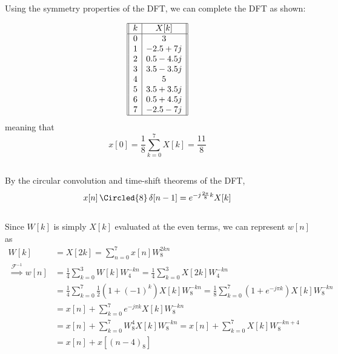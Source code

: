 \documentclass{article}
\begin{document}
\subsection{}

Using the symmetry properties of the DFT, we can complete the DFT as shown:

\begin{equation}
    \begin{array}[]{||c|c||}
        \hline
        k & X[k] \\
        \hline
        0 & 3 \\
        1 & -2.5 + 7j \\
        2 & 0.5 - 4.5j \\
        3 & 3.5 - 3.5j \\
        4 & 5 \\
        5 & 3.5 + 3.5j \\
        6 & 0.5 + 4.5j \\
        7 & -2.5 - 7j \\
        \hline
    \end{array}
\end{equation}
meaning that
\begin{equation}
    x[0] = \frac{1}{8} \sum_{k = 0}^7 X[k] = \frac{11}{8}
\end{equation}

\subsection{}

By the circular convolution and time-shift theorems of the DFT,
\begin{equation}
    x[n] \, \Circled{8} \, \delta[n - 1] = e^{-j \frac{2\pi}{8} k} X[k]
\end{equation}

\subsection{}

Since \(W[k]\) is simply \(X[k]\) evaluated at the even terms, we can represent \(w[n]\) as
\begin{align}
    W[k] &= X[2k] = \sum_{n = 0}^7 x[n] W_8^{2kn} \\
    \overset{\mathcal{F}^{-1}}{\implies} w[n] &= \frac{1}{4} \sum_{k = 0}^3 W[k] W_4^{-kn} = \frac{1}{4} \sum_{k = 0}^3 X[2k] W_4^{-kn} \\
    &= \frac{1}{4} \sum_{k = 0}^7 \frac{1}{2} (1 + (-1)^k) X[k] W_8^{-kn} = \frac{1}{8} \sum_{k = 0}^7 (1 + e^{-j \pi k}) X[k] W_8^{-kn} \\
    &= x[n] + \sum_{k = 0}^7 e^{-j \pi k} X[k] W_8^{-kn} \\
    &= x[n] + \sum_{k = 0}^7 W_8^4 X[k] W_8^{-kn} = x[n] + \sum_{k = 0}^7 X[k] W_8^{-kn + 4} \\
    &= x[n] + x[(n - 4)_8]
\end{align}
\end{document}
